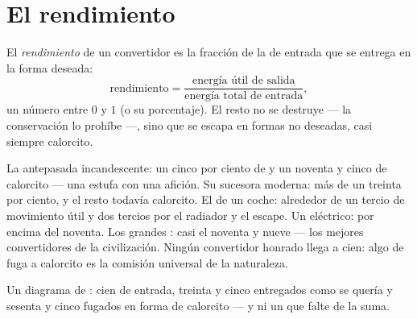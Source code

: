 \section{El rendimiento}

\begin{definition}[Rendimiento]\label{def:g9:energy-conversions:efficiency}
El \emph{rendimiento} de un convertidor es la
fracción de la  de entrada que se entrega en la forma
deseada:
\[
\text{rendimiento} =
\frac{\text{energía útil de salida}}{\text{energía total de entrada}},
\]
un número entre $0$ y $1$ (o su porcentaje). El resto no se destruye
--- la conservación lo prohíbe ---, sino que se escapa en formas no
deseadas, casi siempre calorcito.
\end{definition}

\begin{example}\label{ex:g9:energy-conversions:reportcards}
La  antepasada incandescente: un cinco por ciento de
 y un noventa y cinco de calorcito --- una estufa con una
afición. Su sucesora moderna: más de un treinta por ciento, y el resto
todavía calorcito. El  de un coche: alrededor de un tercio de
movimiento útil y dos tercios por el radiador y el escape. Un
 eléctrico: por encima del noventa. Los grandes
: casi el noventa y nueve --- los mejores convertidores
de la civilización. Ningún convertidor honrado llega a cien: algo de
fuga a calorcito es la comisión universal de la naturaleza.
\end{example}

\begin{omfigure}

{\small Un diagrama de : cien  de
entrada, treinta y cinco entregados como se quería y sesenta y cinco
fugados en forma de calorcito --- y ni un  que falte de la
suma.}
\end{omfigure}

